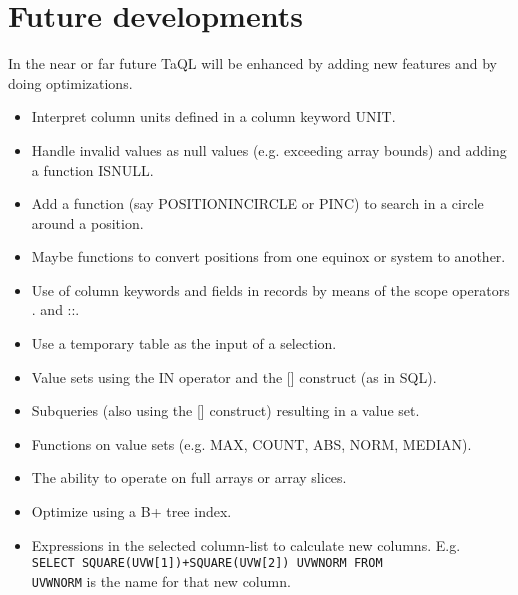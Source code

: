 \section{Future developments}
In the near or far future TaQL will be enhanced by adding new
features and by doing optimizations.
\begin{itemize}
  \item Interpret column units defined in a column keyword UNIT.
  \item Handle invalid values as null values (e.g. exceeding array bounds)
       and adding a function ISNULL.
  \item Add a function (say POSITIONINCIRCLE or PINC) to search in a circle
       around a position.
  \item Maybe functions to convert positions from one equinox or system
       to another.
  \item Use of column keywords and fields in records by means of the
       scope operators . and ::.
  \item Use a temporary table as the input of a selection.
  \item Value sets using the IN operator and the [] construct (as in SQL).
  \item Subqueries (also using the [] construct) resulting in a value set.
  \item Functions on value sets (e.g. MAX, COUNT, ABS, NORM, MEDIAN).
  \item The ability to operate on full arrays or array slices.
  \item Optimize using a B+ tree index.
  \item Expressions in the selected column-list to calculate new columns. E.g.
       \\\texttt{SELECT SQUARE(UVW[1])+SQUARE(UVW[2]) UVWNORM FROM }
       \\\texttt{UVWNORM} is the name for that new column.
\end{itemize}
